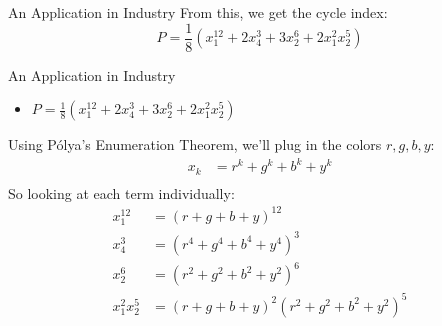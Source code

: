 \documentclass{beamer}
\begin{document}

\begin{frame}{An Application in Industry}
From this, we get the cycle index:\\
\[P = \frac{1}{8}(x_1^{12}+2x_4^3 +3x_2^6 +2x_1^2 x_2^5)\]
\end{frame}

\begin{frame}{An Application in Industry}
\begin{itemize}
\item $P = \frac{1}{8}(x_1^{12}+2x_4^3 +3x_2^6 +2x_1^2 x_2^5)$
\end{itemize}
Using Pólya's Enumeration Theorem, we'll plug in the colors $r,g,b,y$:\\
\begin{align*}
x_k &= r^k + g^k + b^k + y^k\\
\end{align*}
So looking at each term individually:
\begin{align*}
x_1^{12} &= (r+g+b+y)^{12}\\
x_4^3 &=(r^4+g^4+b^4+y^4)^3\\
x_2^6 &=(r^2+g^2+b^2+y^2)^6\\
x_1^{2}x_2^5 &= (r+g+b+y)^2(r^2+g^2+b^2+y^2)^5\\
\end{align*}
\end{frame}
\end{document}
